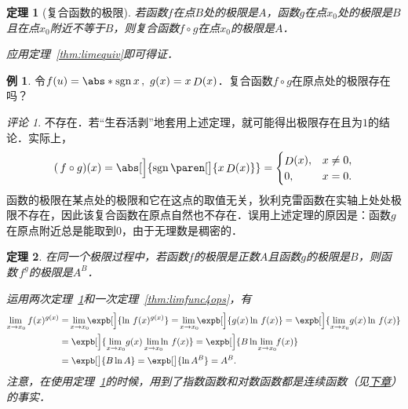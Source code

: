 \documentclass[a4paper,punct=CCT]{ctexbook}
\makeatletter
\newtheorem{theorem}{定理}
\theoremstyle{definition}
\newtheorem*{example*}{例}
\theoremstyle{remark}
\newtheorem*{remark}{评论}
\renewenvironment{proof}[1][\proofname]{\par
  \pushQED{\qed}%
  \normalfont \topsep6\p@\@plus6\p@\relax
  \trivlist
  \item[]\ignorespaces
}{%
  \popQED\endtrivlist\@endpefalse
}
\makeatother
\begin{document}
\begin{theorem}[复合函数的极限]
  \label{thm:limfunccomp}
  若函数\(f\)在点\(B\)处的极限是\(A\)，函数\(g\)在点\(x_0\)处的极限是\(B\)且在点\(x_0\)附近不等于\(B\)，则复合函数\(f \circ g\)在点\(x_0\)的极限是\(A\)．

  \begin{proof}
    应用定理~\ref{thm:limequiv}即可得证．
  \end{proof}
\end{theorem}

\begin{example*}
  令\(f(u) = \abs*{\sgn x}\,,\ g(x) = x \Fn D(x)\)．复合函数\(f \circ g\)在原点处的极限存在吗？

  \begin{remark}
    不存在．若“生吞活剥”地套用上述定理，就可能得出极限存在且为\(1\)的结论．实际上，
    \begin{equation*}
      (\,f \circ g)(x)
      = \abs[\Big]{\sgn\paren[\big]{x \Fn D(x)}} =
      \begin{cases}
        \Fn D(x), & x \ne 0, \\
        0, & x = 0.
      \end{cases}
    \end{equation*}
    函数的极限在某点处的极限和它在这点的取值无关，狄利克雷函数在实轴上处处极限不存在，因此该复合函数在原点自然也不存在．误用上述定理的原因是：函数\(g\)在原点附近总是能取到\(0\)，由于无理数是稠密的．
  \end{remark}
\end{example*}

\begin{theorem}
  \label{thm:limfuncpowexp}
  在同一个极限过程中，若函数\(f\)的极限是正数\(A\)且函数\(g\!\)的极限是\(B\)，则函数\(\,f^g\!\)的极限是\(A^B\)．

  \begin{proof}
    运用两次定理~\ref{thm:limfunccomp}和一次定理~\ref{thm:limfunc4ops}，有
    \begin{align*}
      \lim_{x \to x_0\!} \,f(x)^{g(x)}
      &= {}\smashoperator{\lim_{x \to x_0\!}} \expb[\Big]{\ln \,f(x)^{g(x)}}
        = {}\smashoperator{\lim_{x \to x_0\!}} \expb[\Big]{g(x) \ln \,f(x)}
        = \expb[\Big]{\lim_{x \to x_0\!} g(x) \ln \,f(x)} \\
      &= \expb[\Big]{\lim_{x \to x_0\!} g(x) \smashoperator[r]{\lim_{x \to x_0\!}} \ln \,f(x)}
        = \expb[\Big]{B \ln {}\smashoperator{\lim_{x \to x_0\!}} \,f(x)} \\
      &= \expb[\big]{B \ln A} = \expb[\big]{\ln A^B} = A^B.
    \end{align*}
    注意，在使用定理~\ref{thm:limfunccomp}的时候，用到了指数函数和对数函数都是连续函数（见\hyperref[chap:cont]{下章}）的事实．
  \end{proof}
\end{theorem}
\end{document}

